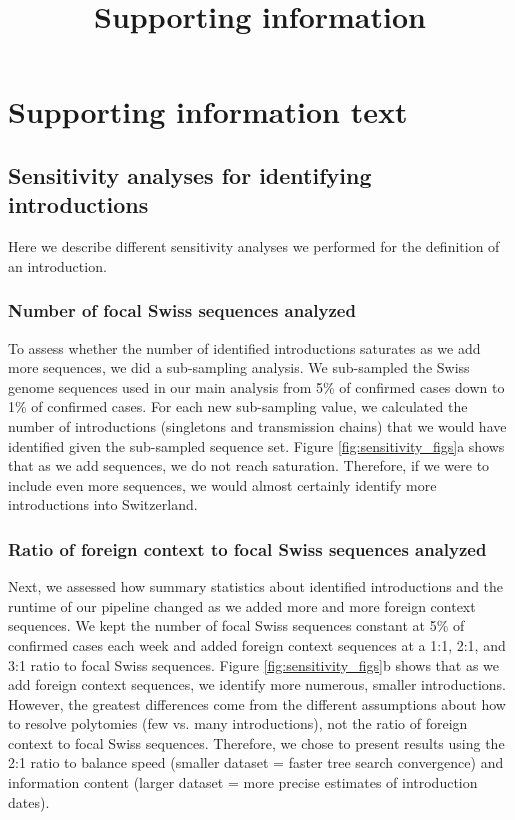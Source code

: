 \documentclass[9pt,twoside,lineno]{pnas-new}
\title{Supporting information}
\author{}
\begin{document}
\maketitle 

\section{Supporting information text}

\subsection{Sensitivity analyses for identifying introductions}
Here we describe different sensitivity analyses we performed for the definition of an introduction. 

\subsubsection{Number of focal Swiss sequences analyzed}
To assess whether the number of identified introductions saturates as we add more sequences, we did a sub-sampling analysis. We sub-sampled the Swiss genome sequences used in our main analysis from 5\% of confirmed cases down to 1\% of confirmed cases. For each new sub-sampling value, we calculated the number of introductions (singletons and transmission chains) that we would have identified given the sub-sampled sequence set. Figure \ref{fig:sensitivity_figs}a shows that as we add sequences, we do not reach saturation. Therefore, if we were to include even more sequences, we would almost certainly identify more introductions into Switzerland.

\subsubsection{Ratio of foreign context to focal Swiss sequences analyzed}
Next, we assessed how summary statistics about identified introductions and the runtime of our pipeline changed as we added more and more foreign context sequences. We kept the number of focal Swiss sequences constant at 5\% of confirmed cases each week and added foreign context sequences at a 1:1, 2:1, and 3:1 ratio to focal Swiss sequences. Figure \ref{fig:sensitivity_figs}b shows that as we add foreign context sequences, we identify more numerous, smaller introductions. However, the greatest differences come from the different assumptions about how to resolve polytomies (few vs. many introductions), not the ratio of foreign context to focal Swiss sequences. Therefore, we chose to present results using the 2:1 ratio to balance speed (smaller dataset = faster tree search convergence) and information content (larger dataset = more precise estimates of introduction dates).
\end{document}
